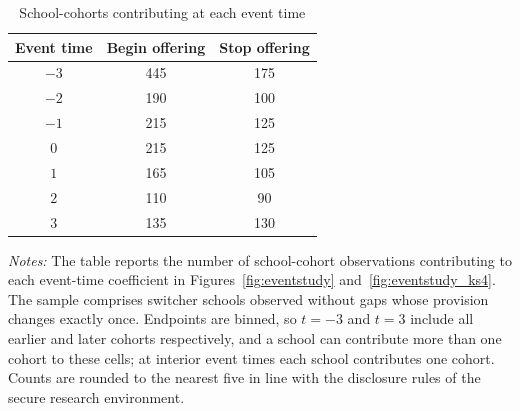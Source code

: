 \begin{table}[htbp]
\centering
\caption{School-cohorts contributing at each event time}
\label{tab:eventstudy_counts}
\begin{tabular}{c cc}
\toprule
Event time & Begin offering & Stop offering \\
\midrule
$-3$       & 445            & 175           \\
$-2$       & 190            & 100           \\
$-1$       & 215            & 125           \\
$0$        & 215            & 125           \\
$1$        & 165            & 105           \\
$2$        & 110            & 90            \\
$3$        & 135            & 130           \\
\bottomrule
\end{tabular}
\begin{minipage}{\textwidth}
\smallskip
\footnotesize
\textit{Notes:} The table reports the number of school-cohort observations contributing to each event-time coefficient in Figures~\ref{fig:eventstudy} and~\ref{fig:eventstudy_ks4}. The sample comprises switcher schools observed without gaps whose provision changes exactly once. Endpoints are binned, so $t=-3$ and $t=3$ include all earlier and later cohorts respectively, and a school can contribute more than one cohort to these cells; at interior event times each school contributes one cohort. Counts are rounded to the nearest five in line with the disclosure rules of the secure research environment.
\end{minipage}
\end{table}
